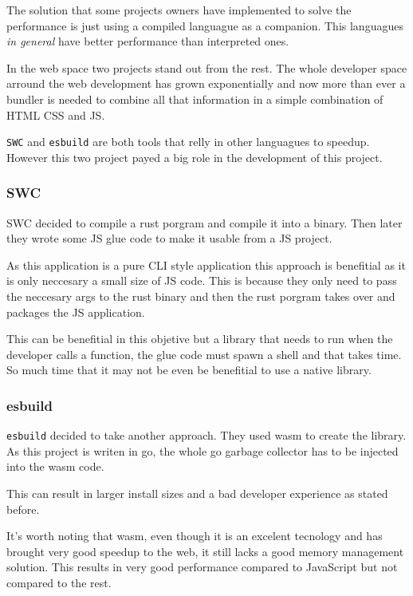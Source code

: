 \documentclass[12pt, letterpaper]{article}
\begin{document}
\begin{multicols}{2}
    The solution that some projects owners have implemented to solve the performance is just using a compiled languague as a companion. This languagues \textit{in general} have better performance than interpreted ones.

    In the web space two projects stand out from the rest. The whole developer space arround the web development has grown exponentially and now more than ever a bundler is needed to combine all that information in a simple combination of HTML CSS and JS.

    \verb|SWC| and \verb|esbuild| are both tools that relly in other languagues to speedup. However this two project payed a big role in the development of this project.

    \subsubsection{SWC}

    SWC decided to compile a rust porgram and compile it into a binary. Then later they wrote some JS glue code to make it usable from a JS project.

    As this application is a pure CLI style application this approach is benefitial as it is only neccesary a small size of JS code. This is because they only need to pass the neccesary args to the rust binary and then the rust porgram takes over and packages the JS application.

    This can be benefitial in this objetive but a library that needs to run when the developer calls a function, the glue code must spawn a shell and that takes time. So much time that it may not be even be benefitial to use a native library.

    \subsubsection{esbuild}

    \verb|esbuild| decided to take another approach. They used wasm to create the library. As this project is writen in go, the whole go garbage collector has to be injected into the wasm code.

    This can result in larger install sizes and a bad developer experience as stated before.

    It's worth noting that wasm, even though it is an excelent tecnology and has brought very good speedup to the web, it still lacks a good memory management solution. This results in very good performance compared to JavaScript but not compared to the rest.


\end{multicols}
\end{document}
